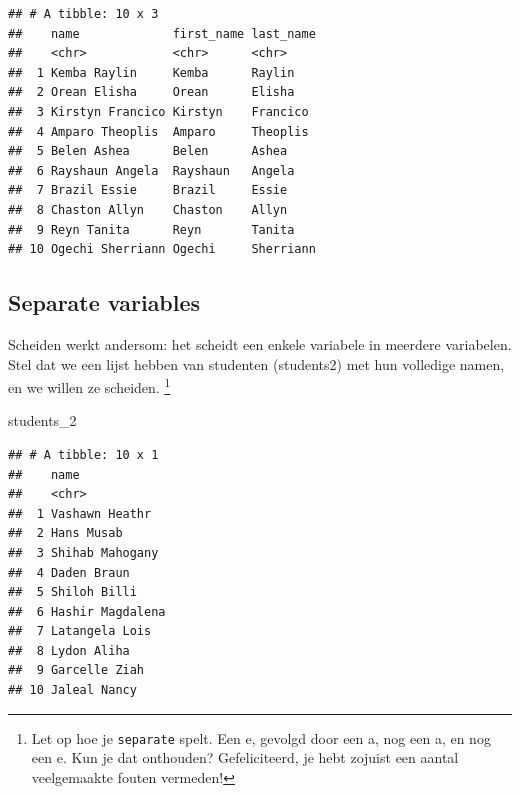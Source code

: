 \documentclass[]{tufte-book}
\newenvironment{Shaded}{}{}
\newcommand{\DataTypeTok}[1]{\textcolor[rgb]{0.56,0.13,0.00}{#1}}
\newcommand{\DecValTok}[1]{\textcolor[rgb]{0.25,0.63,0.44}{#1}}
\newcommand{\KeywordTok}[1]{\textcolor[rgb]{0.00,0.44,0.13}{\textbf{#1}}}
\newcommand{\NormalTok}[1]{#1}
\newcommand{\OperatorTok}[1]{\textcolor[rgb]{0.40,0.40,0.40}{#1}}
\newcommand{\StringTok}[1]{\textcolor[rgb]{0.25,0.44,0.63}{#1}}
\begin{document}
\begin{Shaded}
\end{Shaded}

\begin{verbatim}
## # A tibble: 10 x 3
##    name             first_name last_name
##    <chr>            <chr>      <chr>    
##  1 Kemba Raylin     Kemba      Raylin   
##  2 Orean Elisha     Orean      Elisha   
##  3 Kirstyn Francico Kirstyn    Francico 
##  4 Amparo Theoplis  Amparo     Theoplis 
##  5 Belen Ashea      Belen      Ashea    
##  6 Rayshaun Angela  Rayshaun   Angela   
##  7 Brazil Essie     Brazil     Essie    
##  8 Chaston Allyn    Chaston    Allyn    
##  9 Reyn Tanita      Reyn       Tanita   
## 10 Ogechi Sherriann Ogechi     Sherriann
\end{verbatim}

\hypertarget{separate-variables}{%
\subsection{Separate variables}\label{separate-variables}}

Scheiden werkt andersom: het scheidt een enkele variabele in meerdere variabelen. Stel dat we een lijst hebben van studenten (students2) met hun volledige namen, en we willen ze scheiden. \footnote{Let op hoe je \texttt{separate} spelt. Een e, gevolgd door een a, nog een a, en nog een e. Kun je dat onthouden? Gefeliciteerd, je hebt zojuist een aantal veelgemaakte fouten vermeden!}

\begin{Shaded}
\begin{Highlighting}[]
\NormalTok{students_}\DecValTok{2}
\end{Highlighting}
\end{Shaded}

\begin{verbatim}
## # A tibble: 10 x 1
##    name            
##    <chr>           
##  1 Vashawn Heathr  
##  2 Hans Musab      
##  3 Shihab Mahogany 
##  4 Daden Braun     
##  5 Shiloh Billi    
##  6 Hashir Magdalena
##  7 Latangela Lois  
##  8 Lydon Aliha     
##  9 Garcelle Ziah   
## 10 Jaleal Nancy
\end{verbatim}
\end{document}
